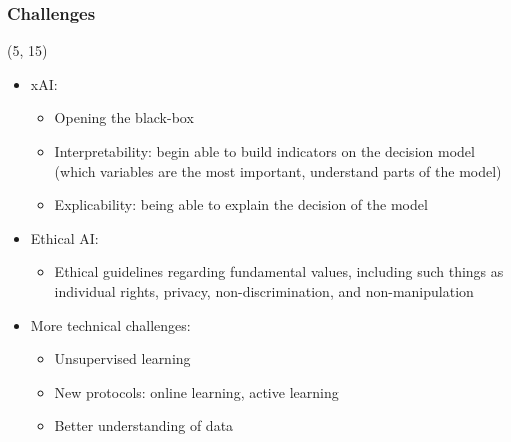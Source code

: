 \begin{frame}
  \frametitle{Challenges}

  \begin{textblock}{90}(5, 15)
    \begin{itemize}
    \item<1-> \ac{xAI}:
      \begin{itemize}
      \item Opening the black-box
      \item Interpretability: begin able to build indicators on the decision model
        (which variables are the most important, understand parts of the model)
      \item Explicability: being able to explain the decision of the model
      \end{itemize}
    \item<2-> Ethical \ac{AI}:
      \begin{itemize}
      \item Ethical guidelines regarding fundamental values, including such things as individual rights, privacy, non-discrimination, and non-manipulation
      \end{itemize}
    \item<3-> More technical challenges:
      \begin{itemize}
      \item Unsupervised learning
      \item New protocols: online learning, active learning
      \item Better understanding of data
      \end{itemize}
    \end{itemize}
  \end{textblock}
\end{frame}
